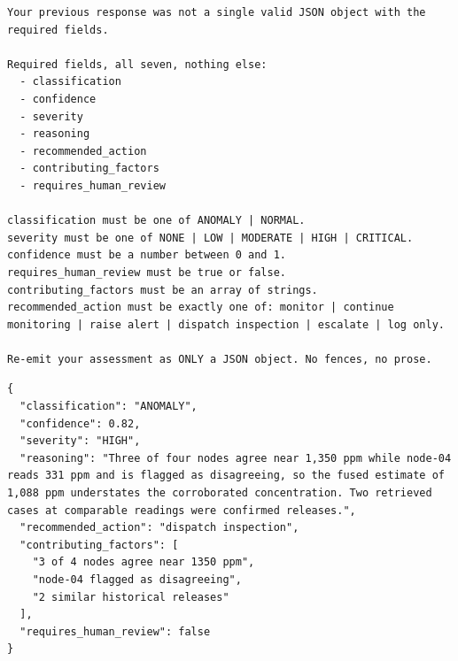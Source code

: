\begin{lstlisting}[style=adamcode,caption={Format-repair instruction, issued at most once per event.},label={lst:repair}]
Your previous response was not a single valid JSON object with the required fields.

Required fields, all seven, nothing else:
  - classification
  - confidence
  - severity
  - reasoning
  - recommended_action
  - contributing_factors
  - requires_human_review

classification must be one of ANOMALY | NORMAL.
severity must be one of NONE | LOW | MODERATE | HIGH | CRITICAL.
confidence must be a number between 0 and 1.
requires_human_review must be true or false.
contributing_factors must be an array of strings.
recommended_action must be exactly one of: monitor | continue monitoring | raise alert | dispatch inspection | escalate | log only.

Re-emit your assessment as ONLY a JSON object. No fences, no prose.
\end{lstlisting}

\begin{lstlisting}[style=adamcode,caption={Valid response for the synthetic illustrative event.},label={lst:example}]
{
  "classification": "ANOMALY",
  "confidence": 0.82,
  "severity": "HIGH",
  "reasoning": "Three of four nodes agree near 1,350 ppm while node-04 reads 331 ppm and is flagged as disagreeing, so the fused estimate of 1,088 ppm understates the corroborated concentration. Two retrieved cases at comparable readings were confirmed releases.",
  "recommended_action": "dispatch inspection",
  "contributing_factors": [
    "3 of 4 nodes agree near 1350 ppm",
    "node-04 flagged as disagreeing",
    "2 similar historical releases"
  ],
  "requires_human_review": false
}
\end{lstlisting}
